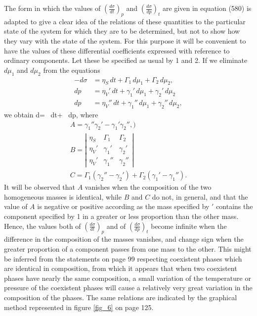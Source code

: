 \documentclass[12pt]{memoir}
\begin{document}
{The form in which the values of $\left(\frac{d\sigma}{dt}\right)_p$ and $\left(\frac{d\sigma}{dp}\right)_t$ are given in equation (580) is adapted to give a clear idea of the relations of these quantities to the particular state of the system for which they are to be determined, but not to show how they vary with the state of the system. For this purpose it will be convenient to have the values of these differential coefficients expressed with reference to ordinary components. Let these be specified as usual by 1 and 2. If we eliminate $d\mu_1$ and $d\mu_2$ from the equations
\begin{align*}-d\sigma &= \eta_S \,dt + \Gamma_1 \, d\mu_1 +\Gamma_2 \, d\mu_2, \\
dp &= \eta_V' \,dt + \gamma_1' \, d\mu_1 +\gamma_2' \, d\mu_2  \\
dp &= \eta_V'' \,dt + \gamma_1'' \, d\mu_1 +\gamma_2'' \, d\mu_2, \end{align*}
we obtain
\eqs d\sigma= \, dt+ \, dp,  \label{581} \eqe
where
\begin{gather}
A = \gamma_1''\gamma_2' - \gamma_1'\gamma_2'',  \label{582}) \\
B=  \left| \begin{array}{ccc}
\eta_S & \Gamma_1 & \Gamma_2  \\
\eta_V' & \gamma_1' & \gamma_2'  \\
\eta_V' & \gamma_1'' & \gamma_2'' \end{array}\right|     \label{583} \\
C= \Gamma_1(\gamma_2'' - \gamma_2')+ \Gamma_2(\gamma_1' - \gamma_1'').   \label{584} \end{gather}
It will be observed that $A$ vanishes when the composition of the two homogeneous masses is identical, while $B$ and $C$ do not, in general, and that the value of $A$ is negative or positive according as the mass specified by $'$ contains the component specified by 1 in a greater or less proportion than the other mass.  Hence, the values both of $\left(\frac{d\sigma}{dt}\right)_p$ and of $\left(\frac{d\sigma}{dp}\right)_t$ become infinite when the difference in the composition of the masses vanishes, and change sign when the greater proportion of a component passes from one mass to the other. This might be inferred from the statements on page 99 respecting coexistent phases which are identical in composition, from which it appears that when two coexistent phases have nearly the same composition, a small variation of the temperature or pressure of the coexistent phases will cause a relatively very great variation in the composition of the phases. The same relations are indicated by the graphical method represented in figure \ref{fig_6} on page 125.

}
\end{document}
